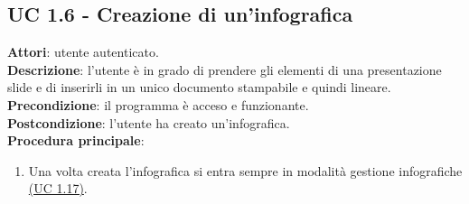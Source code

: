 \subsection{UC 1.6 - Creazione di un'infografica}{
	\label{uc1.6}
	\textbf{Attori}: utente autenticato. \\
	\textbf{Descrizione}: l'utente è in grado di prendere gli elementi di una presentazione slide e di inserirli in un unico documento stampabile e quindi lineare. \\
	\textbf{Precondizione}: il programma è acceso e funzionante.	\\
	\textbf{Postcondizione}: l'utente ha creato un'infografica.	\\
	\textbf{Procedura principale}:
	\begin{enumerate}
		\item Una volta creata l'infografica si entra sempre in modalità gestione infografiche \hyperref[uc1.17]{(UC 1.17)}.
	\end{enumerate}
	}
